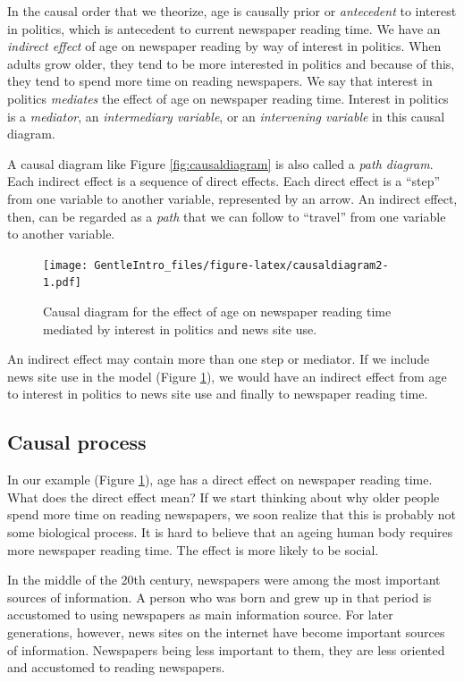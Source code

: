 \documentclass[a4paper]{book}
\theoremstyle{definition}
\theoremstyle{definition}
\theoremstyle{definition}
\theoremstyle{remark}
\begin{document}
In the causal order that we theorize, age is causally prior or
\emph{antecedent} to interest in politics, which is antecedent to
current newspaper reading time. We have an \emph{indirect effect} of age
on newspaper reading by way of interest in politics. When adults grow
older, they tend to be more interested in politics and because of this,
they tend to spend more time on reading newspapers. We say that interest
in politics \emph{mediates} the effect of age on newspaper reading time.
Interest in politics is a \emph{mediator}, an \emph{intermediary
variable}, or an \emph{intervening variable} in this causal diagram.

A causal diagram like Figure \ref{fig:causaldiagram} is also called a
\emph{path diagram}. Each indirect effect is a sequence of direct
effects. Each direct effect is a ``step'' from one variable to another
variable, represented by an arrow. An indirect effect, then, can be
regarded as a \emph{path} that we can follow to ``travel'' from one
variable to another variable.

\begin{figure}
\centering
\texttt{[image: GentleIntro\_files/figure-latex/causaldiagram2-1.pdf]}
\caption{\label{fig:causaldiagram2}Causal diagram for the effect of age on
newspaper reading time mediated by interest in politics and news site
use.}
\end{figure}

An indirect effect may contain more than one step or mediator. If we
include news site use in the model (Figure \ref{fig:causaldiagram2}), we
would have an indirect effect from age to interest in politics to news
site use and finally to newspaper reading time.

\subsection{Causal process}\label{causal-process}

In our example (Figure \ref{fig:causaldiagram2}), age has a direct
effect on newspaper reading time. What does the direct effect mean? If
we start thinking about why older people spend more time on reading
newspapers, we soon realize that this is probably not some biological
process. It is hard to believe that an ageing human body requires more
newspaper reading time. The effect is more likely to be social.

In the middle of the 20th century, newspapers were among the most
important sources of information. A person who was born and grew up in
that period is accustomed to using newspapers as main information
source. For later generations, however, news sites on the internet have
become important sources of information. Newspapers being less important
to them, they are less oriented and accustomed to reading newspapers.
\end{document}
